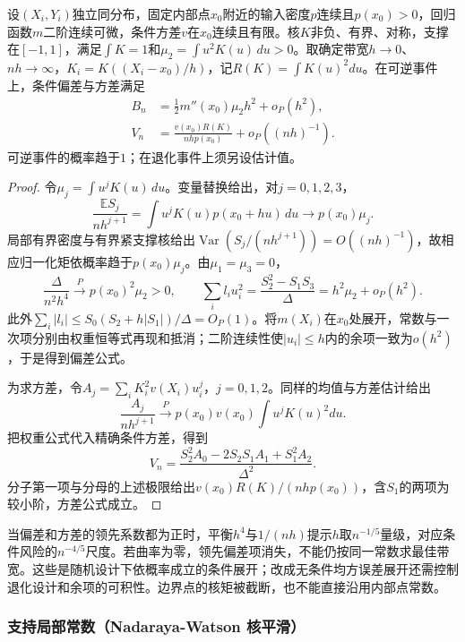\begin{theorem}[一维内部点的局部线性展开]
  \label{thm:regression-local-asymptotic}
  设$(X_i,Y_i)$独立同分布，固定内部点$x_0$附近的输入密度$p$连续且$p(x_0)>0$，回归函数$m$二阶连续可微，条件方差$v$在$x_0$连续且有限。核$K$非负、有界、对称，支撑在$[-1,1]$，满足$\int K=1$和$\mu_2=\int u^2K(u)\,du>0$。取确定带宽$h\to0$、$nh\to\infty$，$K_i=K((X_i-x_0)/h)$，记$R(K)=\int K(u)^2du$。在可逆事件上，条件偏差与方差满足
  \begin{align*}
    B_n&=\tfrac12 m''(x_0)\mu_2h^2+o_P(h^2),\\
    V_n&=\frac{v(x_0)R(K)}{nhp(x_0)}+o_P((nh)^{-1}).
  \end{align*}
  可逆事件的概率趋于$1$；在退化事件上须另设估计值。
\end{theorem}

\begin{proof}
令$\mu_j=\int u^jK(u)\,du$。变量替换给出，对$j=0,1,2,3$，
\[
  \frac{\mathbb{E}S_j}{nh^{j+1}}
  =\int u^jK(u)p(x_0+hu)\,du\longrightarrow p(x_0)\mu_j.
\]
局部有界密度与有界紧支撑核给出$\operatorname{Var}(S_j/(nh^{j+1}))=O((nh)^{-1})$，故相应归一化矩依概率趋于$p(x_0)\mu_j$。由$\mu_1=\mu_3=0$，
\[
  \frac{\Delta}{n^2h^4}\xrightarrow{P}p(x_0)^2\mu_2>0,\qquad
  \sum_i l_i u_i^2
    =\frac{S_2^2-S_1S_3}{\Delta}
    =h^2\mu_2+o_P(h^2).
\]
此外$\sum_i|l_i|\leq S_0(S_2+h|S_1|)/\Delta=O_P(1)$。将$m(X_i)$在$x_0$处展开，常数与一次项分别由权重恒等式再现和抵消；二阶连续性使$|u_i|\leq h$内的余项一致为$o(h^2)$，于是得到偏差公式。

为求方差，令$A_j=\sum_iK_i^2v(X_i)u_i^j$，$j=0,1,2$。同样的均值与方差估计给出
\[
  \frac{A_j}{nh^{j+1}}
    \xrightarrow{P}p(x_0)v(x_0)\int u^jK(u)^2du.
\]
把权重公式代入精确条件方差，得到
\[
  V_n=\frac{S_2^2A_0-2S_2S_1A_1+S_1^2A_2}{\Delta^2}.
\]
分子第一项与分母的上述极限给出$v(x_0)R(K)/(nhp(x_0))$，含$S_1$的两项为较小阶，方差公式成立。
\end{proof}

当偏差和方差的领先系数都为正时，平衡$h^4$与$1/(nh)$提示$h$取$n^{-1/5}$量级，对应条件风险的$n^{-4/5}$尺度。若曲率为零，领先偏差项消失，不能仍按同一常数求最佳带宽。这些是随机设计下依概率成立的条件展开；改成无条件均方误差展开还需控制退化设计和余项的可积性。边界点的核矩被截断，也不能直接沿用内部点常数。

\subsubsection{支持局部常数（Nadaraya-Watson 核平滑）}
\label{sec:regression-nadaraya-watson}

